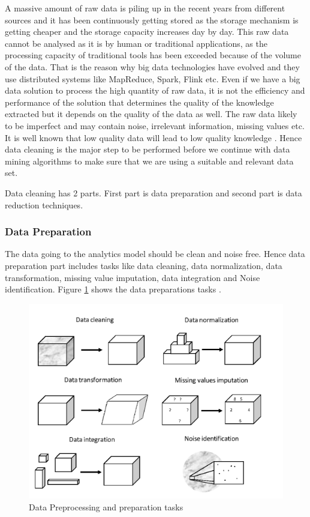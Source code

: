 \documentclass[sigconf]{acmart}
\begin{document}
A massive amount of raw data is piling up in the recent years from different sources and it has been continuously getting stored as the storage mechanism is getting cheaper and the storage capacity increases day by day. This raw data cannot be analysed as it is by human or traditional applications, as the processing capacity of traditional tools has been exceeded because of the volume of the data. That is the reason why big data technologies have evolved and they use distributed systems like MapReduce, Spark, Flink etc. Even if we have a big data solution to process the high quantity of raw data, it is not the efficiency and performance of the solution that determines the quality of the knowledge extracted but it depends on the quality of the data as well. The raw data likely to be imperfect and may contain noise, irrelevant information, missing values etc. It is well known that low quality data will lead to low quality knowledge \cite{preprocessing}. Hence data cleaning is the major step to be performed before we continue with data mining algorithms to make sure that we are using a suitable and relevant data set. 

Data cleaning has 2 parts. First part is data preparation and second part is data reduction techniques. 

\subsubsection{Data Preparation}

The data going to the analytics model should be clean and noise free. Hence data preparation part includes tasks like data cleaning, data normalization, data transformation, missing value imputation, data integration and Noise identification. Figure \ref{fig:Figure5} shows the data preparations tasks \cite{preprocessing}.

\begin{figure}[htb]
  \centering
  \includegraphics[width=1.0\columnwidth]{images/Figure5.png}
  \caption{Data Preprocessing and preparation tasks
  \cite{preprocessing}}
  \label{fig:Figure5} 
\end{figure}
\end{document}
